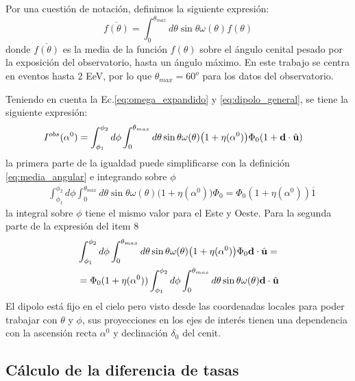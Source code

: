     

     Por una cuestión de notación, definimos la siguiente expresión:
    \begin{equation}
        \overline{f(\theta)} = \int_{0}^{\theta_{max}} d\theta \sin\theta \omega(\theta) f(\theta)
        \label{eq:media_angular}
    \end{equation}
    \noindent donde $\overline{f(\theta)}$ es la media de la función $f(\theta)$ sobre el ángulo cenital pesado por la exposición del observatorio, hasta  un ángulo máximo. En este trabajo se centra en eventos hasta 2 EeV, por lo que $\theta_{max}=60^o$ para los datos del observatorio. 


    Teniendo en cuenta la Ec.\ref{eq:omega_expandido} y \ref{eq:dipolo_general}, se tiene la siguiente expresión:
    \begin{align*}
        I^{obs}(\alpha^0) &= \int_{\phi_1}^{\phi_2} d\phi \int_{0}^{\theta_{max}} d\theta  \sin\theta \omega(\theta)\big(1 + \eta(\alpha^0) \big) \Phi_0 ( 1 +  \textbf{d}\cdot\hat{\bf{u}})
    \end{align*}
    \noindent la primera parte  de la igualdad  puede simplificarse con la definición \ref{eq:media_angular} e integrando sobre $\phi$
    \begin{align*}
        &\int_{\phi_1}^{\phi_2} d\phi \int_{0}^{\theta_{max}} d\theta \sin\theta \omega(\theta)\big(1 + \eta(\alpha^0) \big) \Phi_0 
        = \Phi_0 (1+ \eta(\alpha^0)) \overline{1} 
    \end{align*}
    \noindent la integral sobre $\phi$ tiene el mismo valor para el Este y Oeste. Para la segunda parte de la expresión del item 8
    \begin{align}
        &\int_{\phi_1}^{\phi_2} d\phi \int_{0}^{\theta_{max}} d\theta \sin\theta \omega(\theta)\big(1 + \eta(\alpha^0) \big) \Phi_0 \textbf{d}\cdot\hat{\bf{u}}=\\
        &=\Phi_0 (1+ \eta(\alpha^0))\int_{\phi_1}^{\phi_2} d\phi \int_{0}^{\theta_{max}}  d\theta \sin\theta \omega(\theta)\textbf{d}\cdot\hat{\bf{u}} \label{segundo_term}
    \end{align}
    \noindent El dipolo está fijo en el cielo pero visto desde las coordenadas locales para poder trabajar con $\theta$ y $\phi$, sus proyecciones en los ejes de interés tienen una dependencia con la ascensión recta  $\alpha^0$ y declinación $\delta_0$ del cenit. 



    \subsection{Cálculo de la diferencia de tasas}
    

